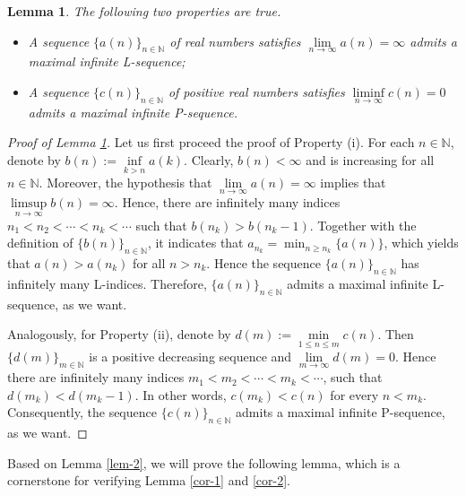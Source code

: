 \documentclass[12pt,reqno]{amsart}
\renewcommand{\=}{\coloneqq}
\theoremstyle{plain}
\newtheorem{lemma}[theorem]{Lemma}
\begin{document}
\begin{lemma}\label{lem-7.5}
The following two properties are true.
\begin{itemize}
\item[(i)] A sequence $\{a(n)\}_{n\in\mathbb{N}}$ of real numbers satisfies $\lim\limits_{n\to\infty}a(n)=\infty$ admits a maximal infinite L-sequence;
\item[(ii)]A sequence $\{c(n)\}_{n\in\mathbb{N}}$ of positive real numbers satisfies $\liminf\limits_{n\to \infty} c(n) = 0$ admits a maximal infinite P-sequence.
\end{itemize}
\end{lemma}
\begin{proof}[Proof of Lemma \ref{lem-7.5}]
Let us first proceed the proof of Property (i). For each $n\in\mathbb{N}$, denote by $b(n):= \inf\limits_{k>n} a(k)$. Clearly, $b(n)<\infty$ and is increasing for all $n\in \mathbb{N}$. Moreover, the hypothesis that $\lim\limits_{n\to\infty}a(n)=\infty$ implies that $\limsup\limits_{n\to\infty}b(n)=\infty$. Hence, there are infinitely many indices $n_1<n_2<\cdots<n_k<\cdots$ such that $b(n_k)>b(n_k - 1)$. Together with the definition of $\{b(n)\}_{n\in\mathbb{N}}$,  it indicates that $a_{n_{k}}=\min_{n\geq n_k}\{a(n)\}$, which yields that $a(n)>a(n_k)$ for all $n> n_k$. Hence the sequence $\{a(n)\}_{n\in\mathbb{N}}$ has infinitely many L-indices. Therefore, $\{a(n)\}_{n\in\mathbb{N}}$ admits a maximal infinite L-sequence, as we want.
			
Analogously, for Property (ii), denote by $d(m):=\min\limits_{1\leq n \leq m} c(n)$. Then $\{d(m)\}_{m\in\mathbb{N}}$ is a positive decreasing sequence and  $\lim\limits_{m\to\infty}d(m)=0$. Hence there are infinitely many indices $m_1<m_2<\cdots<m_k<\cdots$, such that $d(m_k) < d(m_{k}-1)$. In other words, $c(m_k) < c(n)$ for every $n<m_k$. Consequently, the sequence $\{c(n)\}_{n\in\mathbb{N}}$ admits a maximal infinite P-sequence, as we want.
\end{proof}




Based on Lemma \ref{lem-2}, we will prove the following lemma, which is a cornerstone for verifying Lemma \ref{cor-1} and \ref{cor-2}.
		
\end{document}
